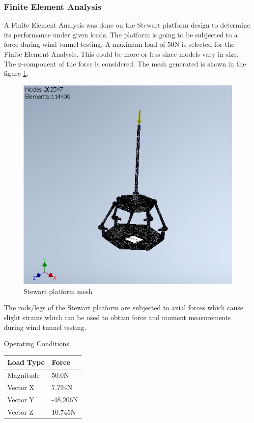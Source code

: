 \subsubsection{Finite Element Analysis}
A Finite Element Analysis was done on the Stewart platform design to determine its performance under given loads. The platform is going to be subjected to a force during wind tunnel testing. A maximum load of 50N is selected for the Finite Element Analysis. This could be more or less since models vary in size. The z-component of the force is considered. 
The mesh generated is shown in the figure \ref{fig:feamesh}.
\begin{center}
	\begin{figure}[H]
	\centering
	\includegraphics[width=0.75\linewidth]{Figures/FEA}
	\caption[Stewart platform mesh]{Stewart platform mesh}
	\label{fig:feamesh}
	\end{figure}
\end{center}
The rods/legs of the Stewart platform are subjected to axial forces which cause slight strains which can be used to obtain force and moment measurements during wind tunnel testing.
\clearpage
\begin{center}
\begin{table}[H]
\caption{Operating Conditions}
\centering
\end{table}
\begin{tabular}{|l|l|}
\hline
\textbf{Load Type} & \textbf{Force}\\
\hline
Magnitude & 50.0N\\
\hline
Vector X & 7.794N\\
\hline
Vector Y & -48.206N\\
\hline
Vector Z & 10.745N\\
\hline
\end{tabular}
\end{center}

